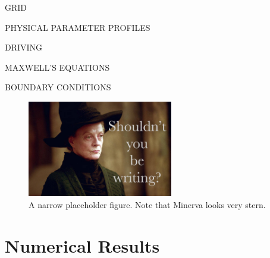 \documentclass[jgrga]{agutex}
\begin{document}
\begin{article}
GRID


PHYSICAL PARAMETER PROFILES


DRIVING


MAXWELL'S EQUATIONS


BOUNDARY CONDITIONS









\begin{figure}
    \label{fig_placeholder_narrow}
    \begin{center}
    \includegraphics[width=15pc]{figures/placeholder.jpg}
    \caption{
        A narrow placeholder figure. Note that Minerva looks very
        stern. 
    }
    \end{center}
\end{figure}

\lipsum[7]


\section{Numerical Results}

\lipsum[8-10]


\end{article}
\end{document}
